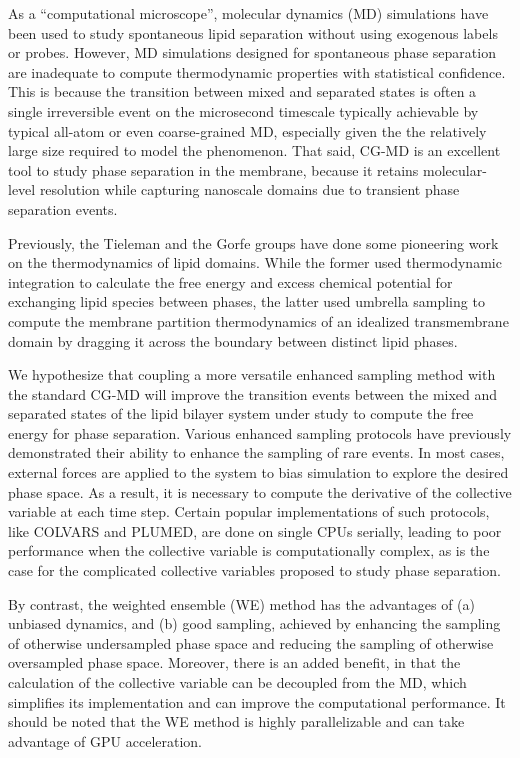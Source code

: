\documentclass{biophys-new}
\begin{document}
As a ``computational microscope\cite{Dror2012}'', molecular dynamics (MD) simulations have been used to study spontaneous lipid separation without using exogenous labels or probes\cite{Pantelopulos2018}.
However, MD simulations designed for spontaneous phase separation are inadequate to compute thermodynamic properties with statistical confidence.
This is because the transition between mixed and separated states is often a single irreversible event on the microsecond timescale typically achievable by typical all-atom or even coarse-grained MD\cite{Risselada2008,Bennett2018}, especially given the
the relatively large size required to model the phenomenon. 
That said, CG-MD is an excellent tool to study phase separation in the membrane, because it retains molecular-level resolution while capturing nanoscale domains due to transient phase separation events.

Previously, the Tieleman\cite{Bennett2018} and the Gorfe groups\cite{Lin2019} have done some pioneering work on the thermodynamics of lipid domains.
While the former used thermodynamic integration\cite{Salsburg1953} to calculate the free energy and excess chemical potential for exchanging lipid species between phases, the latter used umbrella sampling\cite{TorrieG.MValleau1977} to compute the membrane partition thermodynamics of an idealized transmembrane domain by dragging it across the boundary between distinct lipid phases.

We hypothesize that coupling a more versatile enhanced sampling method with the standard CG-MD will improve the transition events between the mixed and separated states of the lipid bilayer system under study to compute the free energy for phase separation.
Various enhanced sampling protocols have previously demonstrated their ability to enhance the sampling of rare events\cite{Henin2022}.
In most cases, external forces are applied to the system to bias simulation to explore the desired phase space.
As a result, it is necessary to compute the derivative of the collective variable at each time step.
Certain popular implementations of such protocols, like COLVARS\cite{Fiorin2013} and PLUMED\cite{Barducci2015}, are done on single CPUs serially, leading to poor performance when the collective variable is computationally complex, as is the case for the complicated collective variables proposed to study phase separation.

By contrast, the weighted ensemble (WE)\cite{Huber1996, Zuckerman2017} method has the advantages of (a) unbiased dynamics, and (b) good sampling, achieved by enhancing the sampling of otherwise undersampled phase space and reducing the sampling of otherwise oversampled phase space.
Moreover, there is an added benefit, in that the calculation of the collective variable can be decoupled from the MD, which simplifies its implementation and can improve the computational performance.
It should be noted that the WE method is highly parallelizable and can take advantage of GPU acceleration\cite{Zwier2015}.
\end{document}
